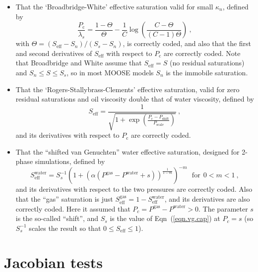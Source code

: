 \documentclass[]{scrreprt}
\begin{document}
\begin{itemize}
\item That the `Broadbridge-White' effective saturation valid for
  small $\kappa_{n}$, defined by
\begin{equation}
\frac{P_{\mathrm{c}}}{\lambda_{s}} = \frac{1-\Theta}{\Theta} - \frac{1}{C}\log
\left( \frac{C-\Theta}{(C-1)\Theta} \right) \ ,
\end{equation}
with $\Theta = (S_{\mathrm{eff}} - S_{n})/(S_{s}-S_{n})$,
is correctly coded, and also that the first and second derivatives of
$S_{\mathrm{eff}}$ with respect to $P_{\mathrm{c}}$ are correctly
coded.  Note that Broadbridge and White assume that
$S_{\mathrm{eff}}=S$ (no residual saturations) and $S_{n}\leq S \leq
S_{s}$, so in most MOOSE models $S_{n}$ is the immobile saturation.

\item That the `Rogers-Stallybrass-Clements' effective saturation,
  valid for zero residual saturations and oil viscosity double that of
  water viscosity, defined by
\begin{equation}
S_{\mathrm{eff}} = \frac{1}{\sqrt{1 +
    \exp\left(\frac{P_{\mathrm{c}}-P_{\mathrm{shift}}}{P_{\mathrm{scale}}}\right)}}
\ ,
\end{equation}
and its derivatives with respect to $P_{\mathrm{c}}$ are correctly coded.

\item That the ``shifted van Genuchten'' water effective saturation,
  designed for 2-phase simulations, defined by
\begin{equation}
S^{\mathrm{water}}_{\mathrm{eff}} = S_{s}^{-1}\left( 1 + (\alpha
  (P^{\mathrm{gas}} - P^{\mathrm{water}} + s))^{\frac{1}{1 - m}}
\right)^{-m} \ \ \ \mbox{for}\ \ 0<m<1 \ ,
\end{equation}
and its derivatives with respect to the two pressures are correctly
coded.  Also that the ``gas'' saturation is just
$S^{\mathrm{gas}}_{\mathrm{eff}}=1-S^{\mathrm{water}}_{\mathrm{eff}}$,
and its derivatives are also correctly coded.
Here it assumed that $P_{c} = P^{\mathrm{gas}}-P^{\mathrm{water}}>0$.
The parameter $s$ is the so-called ``shift'', and $S_{s}$ is the value of
Eqn~(\ref{eqn.vg.cap}) at $P_{c}=s$ (so $S_{s}^{-1}$ scales the result so
that $0\leq S_{\mathrm{eff}}\leq 1$).

\end{itemize}



\chapter{Jacobian tests}
\label{jac}
\end{document}
